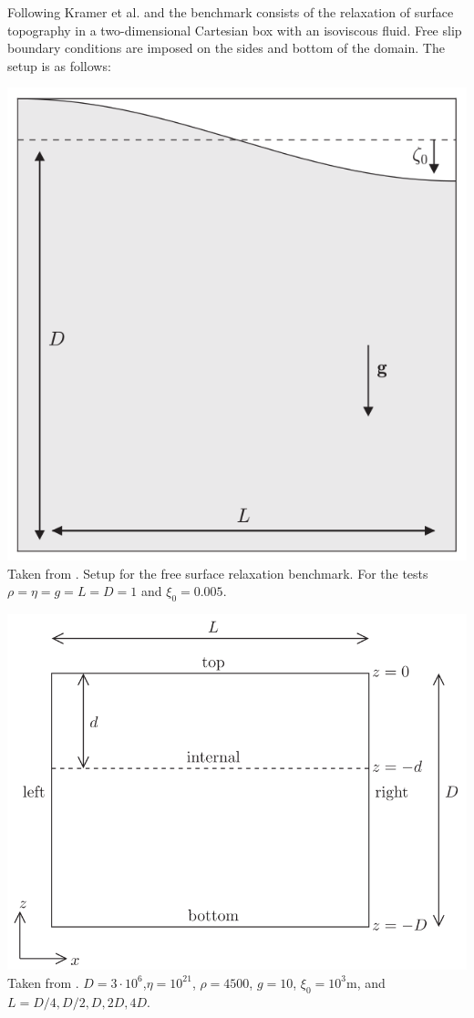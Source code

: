 Following Kramer et al. \cite[Section 3.1.1]{krwd12} and \cite{robh17} 
the benchmark consists of the relaxation of surface topography in a 
two-dimensional Cartesian box with an isoviscous fluid. 
Free slip boundary conditions are imposed on the sides and bottom of the domain.
The setup is as follows:

\begin{center}
\begin{minipage}{0.45\textwidth}
\centering
\includegraphics[height=0.8\textwidth]{images/benchmark_relaxation/robh17}\\
{\captionfont Taken from \cite{robh17}. Setup for the free surface relaxation benchmark.
For the tests $\rho=\eta=g=L=D=1$ and $\xi_0=0.005$.}
\end{minipage}\hfill
\begin{minipage}{0.45\textwidth}
\centering
\includegraphics[height=0.8\textwidth]{images/benchmark_relaxation/krwd12}\\
{\captionfont Taken from \cite{krwd12}. $D=3\cdot 10^6$,$\eta=10^{21}$, $\rho=4500$, $g=10$, $\xi_0=10^3$m, and 
$L=D/4,D/2,D,2D,4D$.}
\end{minipage}
\end{center}
